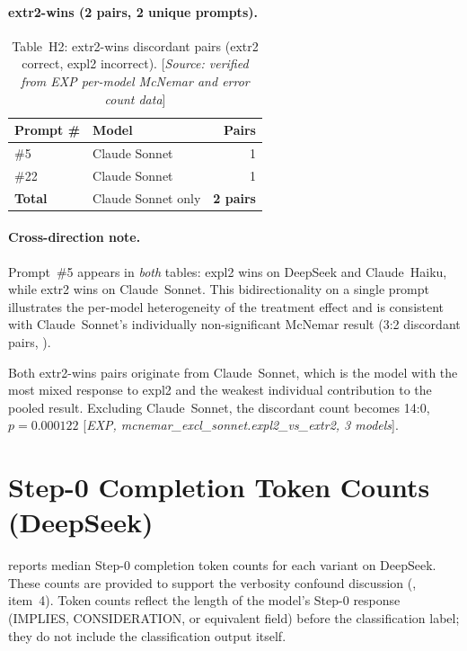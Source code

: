\documentclass[11pt,a4paper]{article}
\begin{document}
\paragraph{extr2-wins (2 pairs, 2 unique prompts).}

\begin{table}[htbp]
\centering
\caption{Table~H2: extr2-wins discordant pairs (\textsf{extr2} correct,
  \textsf{expl2} incorrect).
  [\emph{Source: verified from EXP per-model McNemar and error count data}]}
\label{tab:h2}
\smallskip
\begin{tabular}{@{}llr@{}}
\toprule
Prompt \# & Model & Pairs \\
\midrule
\#5  & Claude Sonnet & 1 \\
\#22 & Claude Sonnet & 1 \\
\midrule
\textbf{Total} & Claude Sonnet only & \textbf{2 pairs} \\
\bottomrule
\end{tabular}
\end{table}

\paragraph{Cross-direction note.}
Prompt~\#5 appears in \emph{both} tables: \textsf{expl2} wins on DeepSeek
and Claude~Haiku, while \textsf{extr2} wins on Claude~Sonnet.  This
bidirectionality on a single prompt illustrates the per-model heterogeneity
of the treatment effect and is consistent with Claude~Sonnet's individually
non-significant McNemar result (3:2 discordant pairs,
).

Both extr2-wins pairs originate from Claude~Sonnet, which is the model with
the most mixed response to \textsf{expl2} and the weakest individual
contribution to the pooled result.  Excluding Claude~Sonnet, the discordant
count becomes 14:0, $p = 0.000122$ [\emph{EXP,
mcnemar\_excl\_sonnet.expl2\_vs\_extr2, 3 models}].

\section{Step-0 Completion Token Counts (DeepSeek)}
\label{app:tokens}

 reports median Step-0 completion token counts for each
variant on DeepSeek.  These counts are provided to support the verbosity
confound discussion (, item~4).  Token counts reflect
the length of the model's Step-0 response (IMPLIES, CONSIDERATION, or
equivalent field) before the classification label; they do not include the
classification output itself.
\end{document}
